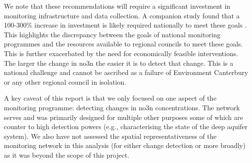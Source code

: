 We note that these recommendations will require a significant investment in monitoring infrastructure and data collection.  A companion study found that a 100-300\% increase in investment is likely required nationally to meet these goals \citep{dumont_determining_nodate}. This highlights the discrepancy between the goals of national monitoring programmes and the resources available to regional councils to meet these goals. This is further exacerbated by the need for economically feasible interventions. The larger the change in \gls{no3n} the easier it is to detect that change. This is a national challenge and cannot be ascribed as a failure of Environment Canterbury or any other regional council in isolation.

A key caveat of this report is that we only focused on one aspect of the monitoring programme: detecting changes in \gls{no3n} concentrations. The network serves and was primarily designed for multiple other purposes some of which are counter to high detection powers (e.g., characterising the state of the deep aquifer system). We also have not assessed the spatial representativeness of the monitoring network in this analysis (for either change detection or more broadly) as it was beyond the scope of this project.